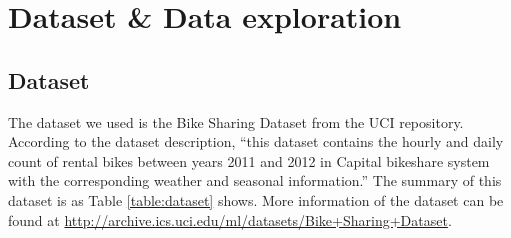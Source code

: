\documentclass[12pt]{article}
\begin{document}
	
	\section{Dataset \& Data exploration}
	\subsection{Dataset}
	The dataset we used is the Bike Sharing Dataset from the UCI repository. According to the dataset description, ``this dataset contains the hourly and daily count of rental bikes between years 2011 and 2012 in Capital bikeshare system with the corresponding weather and seasonal information.''
	The summary of this dataset is as Table \ref{table:dataset} shows. More information of the dataset can be found at \url{http://archive.ics.uci.edu/ml/datasets/Bike+Sharing+Dataset}.
	
\end{document}
